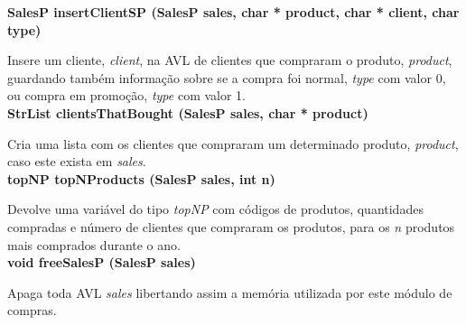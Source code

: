 \documentclass[10pt] {article}
\begin{document}
\noindent \textbf {SalesP insertClientSP (SalesP sales, char * product, char * client, char type)}
\par Insere um cliente, \emph{client}, na AVL de clientes que compraram o produto, \emph{product}, guardando 
também informação sobre se a compra foi normal, \emph{type} com valor 0, ou compra em promoção, 
\emph{type} com valor 1.\\

\noindent \textbf {StrList clientsThatBought (SalesP sales, char * product)}
\par Cria uma lista com os clientes que compraram um determinado produto, \emph{product}, caso este exista em
\emph{sales}.\\

\noindent \textbf {topNP topNProducts (SalesP sales, int n)}
\par Devolve uma variável do tipo \emph{topNP} com códigos de produtos, quantidades compradas e número de 
clientes que compraram os produtos, para os \emph{n} produtos mais comprados durante o ano.\\

\noindent \textbf {void freeSalesP (SalesP sales)}
\par Apaga toda AVL \emph{sales} libertando assim a memória utilizada por este módulo de compras.\\

\end{document}
